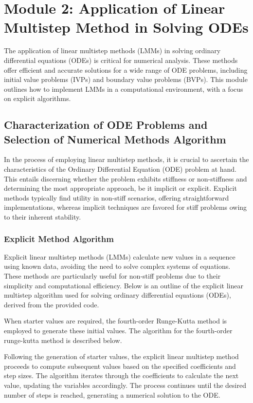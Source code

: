 \section{Module 2: Application of Linear Multistep Method in Solving ODEs}

The application of linear multistep methods (LMMs) in solving ordinary differential equations (ODEs) is critical for numerical analysis. These methods offer efficient and accurate solutions for a wide range of ODE problems, including initial value problems (IVPs) and boundary value problems (BVPs). This module outlines how to implement LMMs in a computational environment, with a focus on explicit algorithms.

\subsection{Characterization of ODE Problems and Selection of Numerical Methods Algorithm}
In the process of employing linear multistep methods, it is crucial to ascertain the characteristics of the Ordinary Differential Equation (ODE) problem at hand. This entails discerning whether the problem exhibits stiffness or non-stiffness and determining the most appropriate approach, be it implicit or explicit. Explicit methods typically find utility in non-stiff scenarios, offering straightforward implementations, whereas implicit techniques are favored for stiff problems owing to their inherent stability.


\subsubsection{Explicit Method Algorithm}
Explicit linear multistep methods (LMMs) calculate new values in a sequence using known data, avoiding the need to solve complex systems of equations. These methods are particularly useful for non-stiff problems due to their simplicity and computational efficiency. Below is an outline of the explicit linear multistep algorithm used for solving ordinary differential equations (ODEs), derived from the provided code.

When starter values are required, the fourth-order Runge-Kutta method is employed to generate these initial values. The algorithm for the fourth-order runge-kutta method is described below.

Following the generation of starter values, the explicit linear multistep method proceeds to compute subsequent values based on the specified coefficients and step sizes. The algorithm iterates through the coefficients to calculate the next value, updating the variables accordingly. The process continues until the desired number of steps is reached, generating a numerical solution to the ODE.





